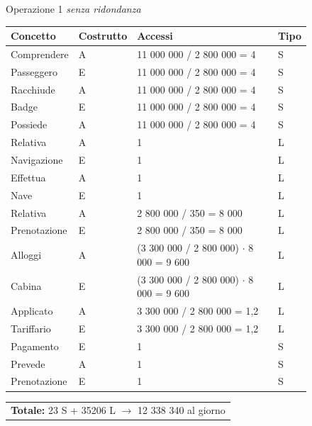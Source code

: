 \documentclass[a4paper, titlepage]{report}
\begin{document}
    \begin{figure}[h]
		\centering
		Operazione 1 \textit{senza ridondanza}\\
		\begin{tabular}{L{3cm}C{2.5cm}C{4.5cm}C{2.5cm}}
			\rule[-2mm]{0mm}{0.65cm}{}
			\textbf{Concetto} & \textbf{Costrutto} &\textbf{Accessi} & \textbf{Tipo} \\
			\hline\rule[-2mm]{0mm}{0.65cm}{}
			Comprendere & A & 11 000 000 / 2 800 000 = 4 & S \\
			\hline\rule[-2mm]{0mm}{0.65cm}{}
			Passeggero & E & 11 000 000 / 2 800 000 = 4 & S \\
			\hline\rule[-2mm]{0mm}{0.65cm}{}
			Racchiude & A & 11 000 000 / 2 800 000 = 4 & S \\
			\hline\rule[-2mm]{0mm}{0.65cm}{}
			Badge & E & 11 000 000 / 2 800 000 = 4 & S \\
			\hline\rule[-2mm]{0mm}{0.65cm}{}
			Possiede & A & 11 000 000 / 2 800 000 = 4 & S \\
			\hline\rule[-2mm]{0mm}{0.65cm}{}
			Relativa & A & 1 & L \\
			\hline\rule[-2mm]{0mm}{0.65cm}{}
			Navigazione & E & 1 & L \\
			\hline\rule[-2mm]{0mm}{0.65cm}{}
			Effettua & A & 1 & L \\
			\hline\rule[-2mm]{0mm}{0.65cm}{}
			Nave & E & 1 & L \\
			\hline\rule[-2mm]{0mm}{0.65cm}{}
			Relativa & A & 2 800 000 / 350 = 8 000 & L \\
			\hline\rule[-2mm]{0mm}{0.65cm}{}
			Prenotazione & E & 2 800 000 / 350 = 8 000 & L \\
			\hline\rule[-2mm]{0mm}{0.65cm}{}
			Alloggi & A & (3 300 000 / 2 800 000) $\cdot$ 8 000 = 9 600 & L \\
			\hline\rule[-2mm]{0mm}{0.65cm}{}
			Cabina & E & (3 300 000 / 2 800 000) $\cdot$ 8 000 = 9 600 & L \\
			\hline\rule[-2mm]{0mm}{0.65cm}{}
            Applicato & A & 3 300 000 / 2 800 000 = 1,2 & L \\
            \hline\rule[-2mm]{0mm}{0.65cm}{}
            Tariffario & E & 3 300 000 / 2 800 000 = 1,2 & L \\
            \hline\rule[-2mm]{0mm}{0.65cm}{}
			Pagamento & E & 1 & S \\
			\hline\rule[-2mm]{0mm}{0.65cm}{}
			Prevede & A & 1 & S \\
            \hline\rule[-2mm]{0mm}{0.65cm}{}
			Prenotazione & E & 1 & S \\
		\end{tabular}
		\begin{tabular}{C{13.9cm}}
			\rule[-4mm]{0mm}{1cm}{}	
			 \textbf{Totale:} 23 S + 35206 L $\to$ 12 338 340 al giorno
		\end{tabular}
	\end{figure}
	
\end{document}

